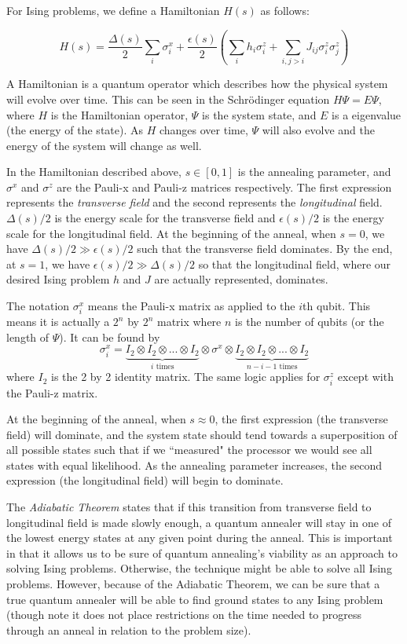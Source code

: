 \documentclass[11pt]{report}
\newcommand{\?}{\stackrel{?}{=}}
\begin{document}
For Ising problems, we define a Hamiltonian $H(s)$ as follows:

$$H(s) = \frac{\Delta(s)}{2}\sum_i \sigma^x_i + \frac{\epsilon(s)}{2}\left(\sum_i h_i\sigma^z_i + \sum_{i, j>i}J_{ij}\sigma^z_i \sigma^z_j\right)$$

A Hamiltonian is a quantum operator which describes how the physical system will evolve over time. This can be seen in the Schr\"{o}dinger equation $H\Psi = E\Psi$, where $H$ is the Hamiltonian operator, $\Psi$ is the system state, and $E$ is a eigenvalue (the energy of the state). As $H$ changes over time, $\Psi$ will also evolve and the energy of the system will change as well.

In the Hamiltonian described above, $s \in [0,1]$ is the annealing parameter, and $\sigma^x$ and $\sigma^z$ are the Pauli-x and Pauli-z matrices respectively. The first expression represents the \textit{transverse field} and the second represents the \textit{longitudinal} field. $\Delta(s)/2$ is the energy scale for the transverse field and $\epsilon(s)/2$ is the energy scale for the longitudinal field. At the beginning of the anneal, when $s = 0$, we have $\Delta(s)/2 \gg \epsilon(s)/2$ such that the transverse field dominates. By the end, at $s=1$, we have $\epsilon(s)/2 \gg \Delta(s)/2$ so that the longitudinal field, where our desired Ising problem $h$ and $J$ are actually represented, dominates.

The notation $\sigma^x_i$ means the Pauli-x matrix as applied to the $i$th qubit. This means it is actually a $2^n$ by $2^n$ matrix where $n$ is the number of qubits (or the length of $\Psi$). It can be found by 
$$\sigma^x_i = \underbrace{I_2 \otimes I_2 \otimes... \otimes I_2}_{i \text{ times}} \otimes \sigma^x \otimes \underbrace{I_2 \otimes I_2 \otimes ...\otimes I_2}_{n - i - 1 \text{ times}}$$
where $I_2$ is the 2 by 2 identity matrix. The same logic applies for $\sigma^z_i$ except with the Pauli-z matrix.

At the beginning of the anneal, when $s \approx 0$, the first expression (the transverse field) will dominate, and the system state should tend towards a superposition of all possible states such that if we ``measured" the processor we would see all states with equal likelihood. As the annealing parameter increases, the second expression (the longitudinal field) will begin to dominate. 

The \textit{Adiabatic Theorem} states that if this transition from transverse field to longitudinal field is made slowly enough, a quantum annealer will stay in one of the lowest energy states at any given point during the anneal. This is important in that it allows us to be sure of quantum annealing's viability as an approach to solving Ising problems. Otherwise, the technique might be able to solve all Ising problems. However, because of the Adiabatic Theorem, we can be sure that a true quantum annealer will be able to find ground states to any Ising problem (though note it does not place restrictions on the time needed to progress through an anneal in relation to the problem size).
\end{document}
